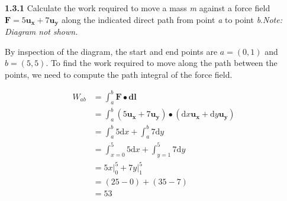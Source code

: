 \documentclass{article}
\begin{document}
\textbf{1.3.1} Calculate the work required to move a mass \textit{m} against a force field $\mathbf{F} = 5\mathbf{u_x} +
	7\mathbf{u_y}$ along the indicated direct path from point \textit{a} to point \textit{b}.\@ \textit{Note: Diagram
	not shown.}

\vspace{24pt}

By inspection of the diagram, the start and end points are $a = (0, 1)$ and $b = (5, 5)$. To find the work required to
move along the path between the points, we need to compute the path integral of the force field.

\begin{equation*}
	\begin{split}
		W_{ab} & = \int_a^b \mathbf{F} \bullet \mathbf{dl} \\
		& = \int_a^b (5\mathbf{u_x} + 7\mathbf{u_y}) \bullet (\text{d}x\mathbf{u_x} + \text{d}y\mathbf{u_y}) \\
		& = \int_a^b 5 \text{d}x + \int_a^b 7 \text{d}y \\
		& = \int_{x = 0}^{5} 5 \text{d}x + \int_{y = 1}^{5} 7 \text{d}y \\
		& = 5x \big\rvert_0^5 + 7y \big\rvert_1^5 \\
		& = (25 - 0) + (35 - 7) \\
		& = 53
	\end{split}
\end{equation*}
\end{document}
